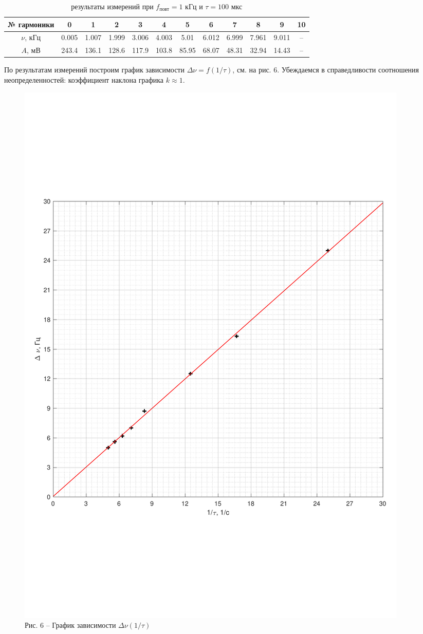 \documentclass[a4paper,14pt]{article}
\begin{document}
\begin{table}[hbt!]
	\begin{center}
		\begin{tabular}{|c|c|c|c|c|c|c|c|c|c|c|c|}
			\hline
			№ гармоники & 0     & 1     & 2     & 3     & 4     & 5     & 6     & 7     & 8     & 9     & 10 \\ \hline
			$\nu$, кГц      & 0.005 & 1.007 & 1.999 & 3.006 & 4.003 & 5.01  & 6.012 & 6.999 & 7.961 & 9.011 & --  \\ \hline
			$A$, мВ         & 243.4 & 136.1 & 128.6 & 117.9 & 103.8 & 85.95 & 68.07 & 48.31 & 32.94 & 14.43 & --  \\ \hline
		\end{tabular}
		\caption{результаты измерений при $f_\text{повт} = 1$ кГц  и $\tau = 100$ мкс}
		\label{tab3}
	\end{center}
\end{table}

По результатам измерений построим график зависимости $\Delta \nu = f(1/\tau)$, см. на рис. 6. Убеждаемся в справедливости соотношения неопределенностей: коэффициент наклона графика $k \approx 1$.


\begin{center}
	\begin{figure}[hbt!]
		\centering
		\includegraphics[width=0.7\linewidth]{gr1.pdf} \\
		Рис. 6 -- График зависимости $\Delta \nu(1/\tau)$
		\label{gr1}
	\end{figure}
\end{center}
\end{document}
